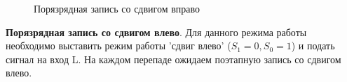 \begin{figure}[H]
    \hspace{20mm}
    \caption{Порязрядная запись со сдвигом вправо}
\end{figure}

\newpage

\textbf{Порязрядная запись со сдвигом влево}. Для данного режима работы необходимо выставить режим работы
'сдвиг влево' ($S_1=0,S_0=1$) и подать сигнал на вход L. На каждом перепаде ожидаем поэтапную запись со сдвигом влево.

